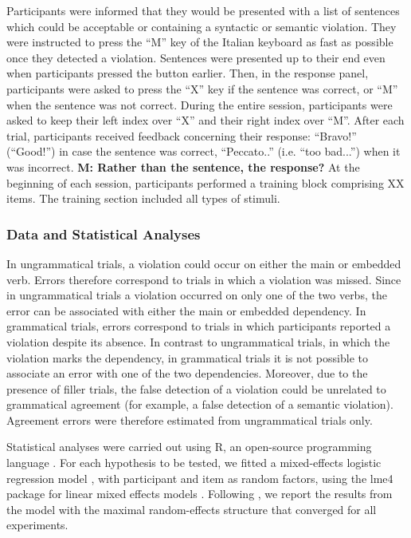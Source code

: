 Participants were informed that they would be presented with a list of sentences which could be acceptable or containing a syntactic or semantic violation. They were instructed to press the “M” key of the Italian keyboard as fast as possible once they detected a violation. Sentences were presented up to their end even when participants pressed the button earlier. Then, in the response panel, participants were asked to press the “X” key if the sentence was correct, or “M” when the sentence was not correct. During the entire session, participants were asked to keep their left index over “X” and their right index over “M”. After each trial, participants received feedback concerning their response: ``Bravo!'' (``Good!'') in  case the sentence was correct, ``Peccato..'' (i.e. ``too bad...'') when it was incorrect. \textbf{M: Rather than the sentence, the response?} At the beginning of each session, participants performed a training block comprising XX items. The training section included all types of stimuli.

\subsubsection{Data and Statistical Analyses}
In ungrammatical trials, a violation could occur on either the main or embedded verb. Errors therefore correspond to trials in which a violation was missed. Since in ungrammatical trials a violation occurred on only one of the two verbs, the error can be associated with either the main or embedded dependency. In grammatical trials, errors correspond to trials in which participants reported a violation despite its absence. In contrast to ungrammatical trials, in which the violation marks the dependency, in grammatical trials it is not possible to associate an error with one of the two dependencies. Moreover, due to the presence of filler trials, the false detection of a violation could be unrelated to grammatical agreement (for example, a false detection of a semantic violation). Agreement errors were therefore estimated from ungrammatical trials only.

Statistical analyses were carried out using R, an open-source programming language \citep{R}. For each hypothesis to be tested, we fitted a mixed-effects logistic regression model \citep{Jaeger2008}, with participant and item as random factors, using the lme4 package for linear mixed effects models \citep{Bates}. Following \citet{Baayen:etal:2008}, we report the results from the model with the maximal random-effects structure that converged for all experiments. 

